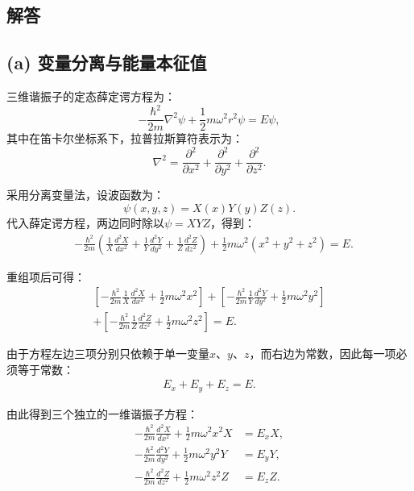 \subsection*{解答}

\subsection*{(a) 变量分离与能量本征值}

三维谐振子的定态薛定谔方程为：
\[
-\frac{\hbar^{2}}{2m} \nabla^{2}\psi + \frac{1}{2}m\omega^{2}r^{2}\psi = E\psi,
\]
其中在笛卡尔坐标系下，拉普拉斯算符表示为：
\[
\nabla^{2} = \frac{\partial^{2}}{\partial x^{2}} + \frac{\partial^{2}}{\partial y^{2}} + \frac{\partial^{2}}{\partial z^{2}}.
\]

采用分离变量法，设波函数为：
\[
\psi(x,y,z) = X(x)Y(y)Z(z).
\]
代入薛定谔方程，两边同时除以\(\psi = XYZ\)，得到：
\begin{align*}
	&-\frac{\hbar^{2}}{2m} \left( \frac{1}{X}\frac{d^{2}X}{dx^{2}} + \frac{1}{Y}\frac{d^{2}Y}{dy^{2}} + \frac{1}{Z}\frac{d^{2}Z}{dz^{2}} \right) + \frac{1}{2}m\omega^{2}(x^{2} + y^{2} + z^{2}) = E.
\end{align*}

重组项后可得：
\begin{align}
	\left[ -\frac{\hbar^{2}}{2m} \frac{1}{X} \frac{d^{2}X}{dx^{2}} + \frac{1}{2}m\omega^{2}x^{2} \right] 
	+ \left[ -\frac{\hbar^{2}}{2m} \frac{1}{Y} \frac{d^{2}Y}{dy^{2}} + \frac{1}{2}m\omega^{2}y^{2} \right] \nonumber \\
	+ \left[ -\frac{\hbar^{2}}{2m} \frac{1}{Z} \frac{d^{2}Z}{dz^{2}} + \frac{1}{2}m\omega^{2}z^{2} \right] = E. \label{eq:separated}
\end{align}

由于方程左边三项分别只依赖于单一变量\(x\)、\(y\)、\(z\)，而右边为常数，因此每一项必须等于常数：
\begin{align*}
	E_x + E_y + E_z = E.
\end{align*}

由此得到三个独立的一维谐振子方程：
\begin{align}
	-\frac{\hbar^{2}}{2m} \frac{d^{2}X}{dx^{2}} + \frac{1}{2}m\omega^{2}x^{2}X &= E_x X, \label{eq:x_eq} \\
	-\frac{\hbar^{2}}{2m} \frac{d^{2}Y}{dy^{2}} + \frac{1}{2}m\omega^{2}y^{2}Y &= E_y Y, \label{eq:y_eq} \\
	-\frac{\hbar^{2}}{2m} \frac{d^{2}Z}{dz^{2}} + \frac{1}{2}m\omega^{2}z^{2}Z &= E_z Z. \label{eq:z_eq}
\end{align}

